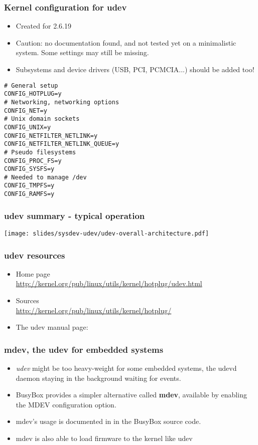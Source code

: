 \begin{frame}[fragile]
  \frametitle{Kernel configuration for udev}
  \begin{itemize}
  \item Created for 2.6.19
  \item Caution: no documentation found, and not tested yet on a minimalistic system. Some settings may still be missing.
  \item Subsystems and device drivers (USB, PCI, PCMCIA...) should be added too!
  \end{itemize}
  \begin{block}{}
\tiny
\begin{verbatim}
# General setup
CONFIG_HOTPLUG=y
# Networking, networking options
CONFIG_NET=y
# Unix domain sockets
CONFIG_UNIX=y
CONFIG_NETFILTER_NETLINK=y
CONFIG_NETFILTER_NETLINK_QUEUE=y
# Pseudo filesystems
CONFIG_PROC_FS=y
CONFIG_SYSFS=y
# Needed to manage /dev
CONFIG_TMPFS=y
CONFIG_RAMFS=y
\end{verbatim}
  \end{block}
\end{frame}

\begin{frame}
  \frametitle{udev summary - typical operation}
  \begin{center}
    \texttt{[image: slides/sysdev-udev/udev-overall-architecture.pdf]}
  \end{center}
\end{frame}

\begin{frame}
  \frametitle{udev resources}
  \begin{itemize}
  \item Home page\\
    \url{http://kernel.org/pub/linux/utils/kernel/hotplug/udev.html}
  \item Sources\\
    \url{http://kernel.org/pub/linux/utils/kernel/hotplug/}
  \item The udev manual page:\\
  \end{itemize}
\end{frame}

\begin{frame}
  \frametitle{mdev, the udev for embedded systems}
  \begin{itemize}
  \item {\em udev} might be too heavy-weight for some embedded
    systems, the udevd daemon staying in the background waiting for
    events.
  \item BusyBox provides a simpler alternative called {\bf mdev},
    available by enabling the MDEV configuration option.
  \item mdev's usage is documented in  in the BusyBox source code.
  \item mdev is also able to load firmware to the kernel like udev
  \end{itemize}
\end{frame}

